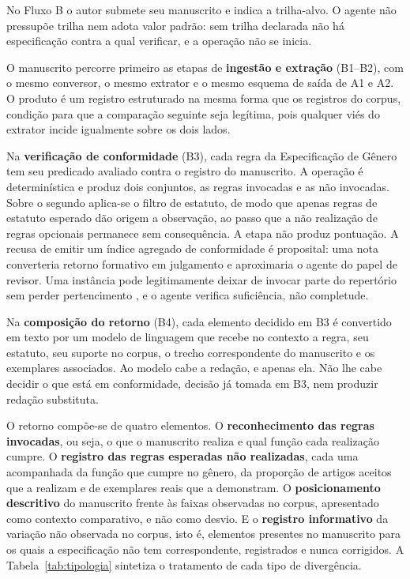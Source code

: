 No Fluxo B o autor submete seu manuscrito e indica a trilha-alvo. O agente não pressupõe trilha nem adota valor padrão: sem trilha declarada não há especificação contra a qual verificar, e a operação não se inicia.

O manuscrito percorre primeiro as etapas de \textbf{ingestão e extração} (B1--B2), com o mesmo conversor, o mesmo extrator e o mesmo esquema de saída de A1 e A2. O produto é um registro estruturado na mesma forma que os registros do corpus, condição para que a comparação seguinte seja legítima, pois qualquer viés do extrator incide igualmente sobre os dois lados.

Na \textbf{verificação de conformidade} (B3), cada regra da Especificação de Gênero tem seu predicado avaliado contra o registro do manuscrito. A operação é determinística e produz dois conjuntos, as regras invocadas e as não invocadas. Sobre o segundo aplica-se o filtro de estatuto, de modo que apenas regras de estatuto esperado dão origem a observação, ao passo que a não realização de regras opcionais permanece sem consequência. A etapa não produz pontuação. A recusa de emitir um índice agregado de conformidade é proposital: uma nota converteria retorno formativo em julgamento e aproximaria o agente do papel de revisor. Uma instância pode legitimamente deixar de invocar parte do repertório sem perder pertencimento \cite{GenresOrgComm}, e o agente verifica suficiência, não completude.

Na \textbf{composição do retorno} (B4), cada elemento decidido em B3 é convertido em texto por um modelo de linguagem que recebe no contexto a regra, seu estatuto, seu suporte no corpus, o trecho correspondente do manuscrito e os exemplares associados. Ao modelo cabe a redação, e apenas ela. Não lhe cabe decidir o que está em conformidade, decisão já tomada em B3, nem produzir redação substituta.

O retorno compõe-se de quatro elementos. O \textbf{reconhecimento das regras invocadas}, ou seja, o que o manuscrito realiza e qual função cada realização cumpre. O \textbf{registro das regras esperadas não realizadas}, cada uma acompanhada da função que cumpre no gênero, da proporção de artigos aceitos que a realizam e de exemplares reais que a demonstram. O \textbf{posicionamento descritivo} do manuscrito frente às faixas observadas no corpus, apresentado como contexto comparativo, e não como desvio. E o \textbf{registro informativo} da variação não observada no corpus, isto é, elementos presentes no manuscrito para os quais a especificação não tem correspondente, registrados e nunca corrigidos. A Tabela~\ref{tab:tipologia} sintetiza o tratamento de cada tipo de divergência.

